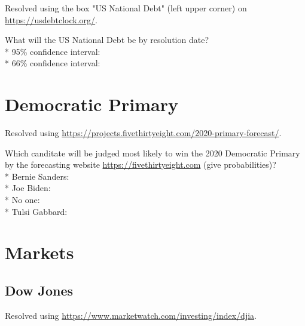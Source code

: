 \documentclass{article}
\begin{document}
Resolved using the box "US National Debt" (left upper corner) on
\href{https://usdebtclock.org/}{https://usdebtclock.org/}.

\vspace{0.3cm}

What will the US National Debt be by resolution date?\\*
95\% confidence interval: \null\hfill\underline{\hspace{8cm}}\\*
66\% confidence interval: \null\hfill\underline{\hspace{8cm}}

\section*{Democratic Primary}

Resolved using
\href{https://projects.fivethirtyeight.com/2020-primary-forecast/}{https://projects.fivethirtyeight.com/2020-primary-forecast/}.

\vspace{0.3cm}

Which canditate will be judged most likely to win the
2020 Democratic Primary by the forecasting website
\href{https://fivethirtyeight.com}{https://fivethirtyeight.com} (give probabilities)?\\*
Bernie Sanders: \null\hfill\underline{\hspace{5cm}}\\*
Joe Biden: \null\hfill\underline{\hspace{5cm}}\\*
No one: \null\hfill\underline{\hspace{5cm}}\\*
Tulsi Gabbard: \null\hfill\underline{\hspace{5cm}}

\section*{Markets}

\subsection*{Dow Jones}

Resolved using
\href{https://www.marketwatch.com/investing/index/djia}{https://www.marketwatch.com/investing/index/djia}.

\vspace{0.3cm}
\end{document}
